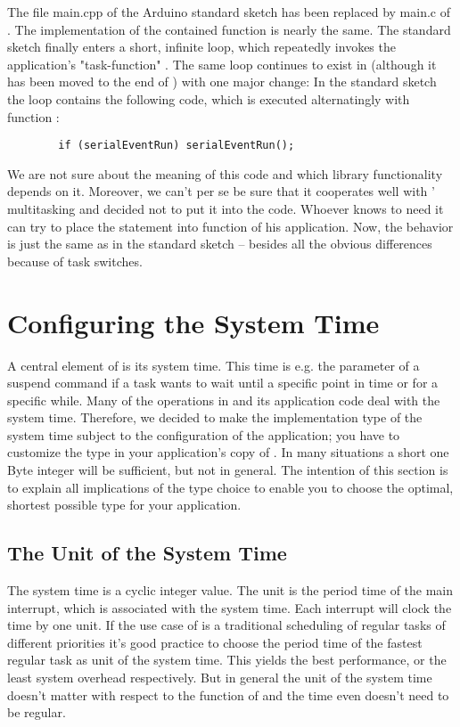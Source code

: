 The file main.cpp of the Arduino standard sketch has been replaced by
main.c of \rtos. The implementation of the contained function 
is nearly the same. The standard sketch finally enters a short, infinite
loop, which repeatedly invokes the application's "task-function"
. The same loop continues to exist in \rtos{} (although it has
been moved to the end of ) with one major change: In
the standard sketch the loop contains the following code, which is
executed alternatingly with function :
\begin{verbatim}
		if (serialEventRun) serialEventRun();
\end{verbatim}
We are not sure about the meaning of this code and which library
functionality depends on it. Moreover, we can't per se be sure that it
cooperates well with \rtos{}' multitasking and decided not to put it into
the \rtos{} code. Whoever knows to need it can try to place the statement
into function  of his \rtos{} application. Now, the behavior
is just the same as in the standard sketch -- besides all the obvious
differences because of task switches.


\section{Configuring the System Time}
\label{secSystemTime}

A central element of \rtos{} is its system time. This time is e.g. the
parameter of a suspend command if a task wants to wait until a specific
point in time or for a specific while. Many of the
operations in \rtos{} and its application code deal with the system time.
Therefore, we decided to make the implementation type of the system time
subject to the configuration of the application; you have to customize the
type in your application's copy of . In many
situations a short one Byte integer will be sufficient, but not in
general. The intention of this section is to explain all implications of
the type choice to enable you to choose the optimal, shortest possible
type for your application.


\subsection{The Unit of the System Time}

The system time is a cyclic integer value. The unit is the period time of
the main interrupt, which is associated with the system time. Each
interrupt will clock the time by one unit. If the use case of \rtos{} is a
traditional scheduling of regular tasks of different priorities it's good
practice to choose the period time of the fastest regular task as unit of
the system time. This yields the best performance, or the least system
overhead respectively. But in general the unit of the system time doesn't
matter with respect to the function of \rtos{} and the time even doesn't
need to be regular.

